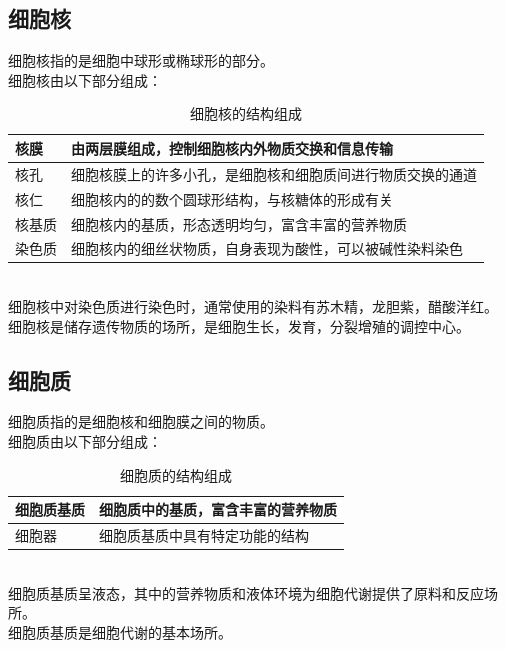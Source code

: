 \documentclass[UTF8]{ctexart}
\begin{document}
\subsection{细胞核}
    细胞核指的是细胞中球形或椭球形的部分。\\[3mm]
    细胞核由以下部分组成：\vspace{5pt}
    \begin{table}[h]
        \begin{center}
            \begin{tabular}{l|l}
                \hline
                核膜\qquad\qquad&由两层膜组成，控制细胞核内外物质交换和信息传输\qquad\qquad\\ \hline
                核孔\qquad\qquad&细胞核膜上的许多小孔，是细胞核和细胞质间进行物质交换的通道\qquad\qquad\\ \hline
                核仁\qquad\qquad&细胞核内的的数个圆球形结构，与核糖体的形成有关\qquad\qquad\\ \hline
                核基质\qquad\qquad&细胞核内的基质，形态透明均匀，富含丰富的营养物质\qquad\qquad\\ \hline
                染色质\qquad\qquad&细胞核内的细丝状物质，自身表现为酸性，可以被碱性染料染色\qquad\qquad\\ \hline
            \end{tabular}
            \caption{细胞核的结构组成}
        \end{center}
    \end{table}\\
    细胞核中对染色质进行染色时，通常使用的染料有苏木精，龙胆紫，醋酸洋红。\\[3mm]
    细胞核是储存遗传物质的场所，是细胞生长，发育，分裂增殖的调控中心。
    
\subsection{细胞质}
    细胞质指的是细胞核和细胞膜之间的物质。\\[3mm]
    细胞质由以下部分组成：\vspace{5pt}
    \begin{table}[h]
        \begin{center}
            \begin{tabular}{l|l}
                \hline
                细胞质基质\qquad\qquad&细胞质中的基质，富含丰富的营养物质\qquad\qquad\\ \hline
                细胞器\qquad\qquad&细胞质基质中具有特定功能的结构\qquad\qquad\\ \hline
            \end{tabular}
            \caption{细胞质的结构组成}
        \end{center}
    \end{table}\\
    细胞质基质呈液态，其中的营养物质和液体环境为细胞代谢提供了原料和反应场所。\\[3mm]
    细胞质基质是细胞代谢的基本场所。
\end{document}
